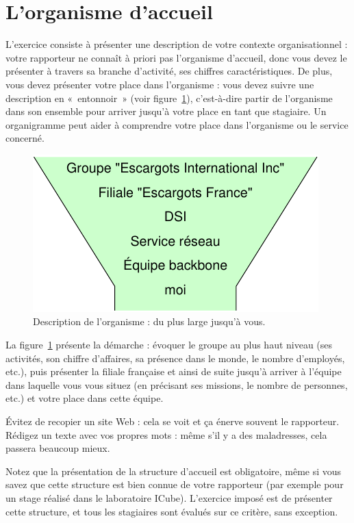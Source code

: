 \documentclass [twoside,openright,a4paper,11pt,french] {report}
\begin{document}
\section {L'organisme d'accueil}

L'exercice consiste à présenter une description de votre contexte
organisationnel : votre rapporteur ne connaît à priori pas
l'organisme d'accueil, donc vous devez le présenter à travers sa
branche d'activité, ses chiffres caractéristiques. De plus, vous
devez présenter votre place dans l'organisme : vous devez suivre une
description en «~entonnoir~» (voir figure~\ref {fig:entonnoir}),
c'est-à-dire partir de l'organisme dans son ensemble pour arriver
jusqu'à votre place en tant que stagiaire. Un organigramme peut aider
à comprendre votre place dans l'organisme ou le service concerné.

\begin {figure} [htbp]
    \begin {center}
	\includegraphics [width=.35\textwidth] {entonnoir.pdf}
    \end {center}
    \label {fig:entonnoir}
    \caption {Description de l'organisme : du plus large jusqu'à vous.}
\end {figure}

La figure~\ref {fig:entonnoir} présente la démarche : évoquer le
groupe au plus haut niveau (ses activités, son chiffre d'affaires, sa
présence dans le monde, le nombre d'employés, etc.), puis présenter
la filiale française et ainsi de suite jusqu'à arriver à l'équipe
dans laquelle vous vous situez (en précisant ses missions, le nombre
de personnes, etc.) et votre place dans cette équipe.

Évitez de recopier un site Web : cela se voit et ça énerve souvent
le rapporteur. Rédigez un texte avec vos propres mots : même s'il y a
des maladresses, cela passera beaucoup mieux.

Notez que la présentation de la structure d'accueil est obligatoire,
même si vous savez que cette structure est bien connue de votre
rapporteur (par exemple pour un stage réalisé dans le laboratoire
ICube). L'exercice imposé est de présenter cette structure, et tous
les stagiaires sont évalués sur ce critère, sans exception.
\end{document}
